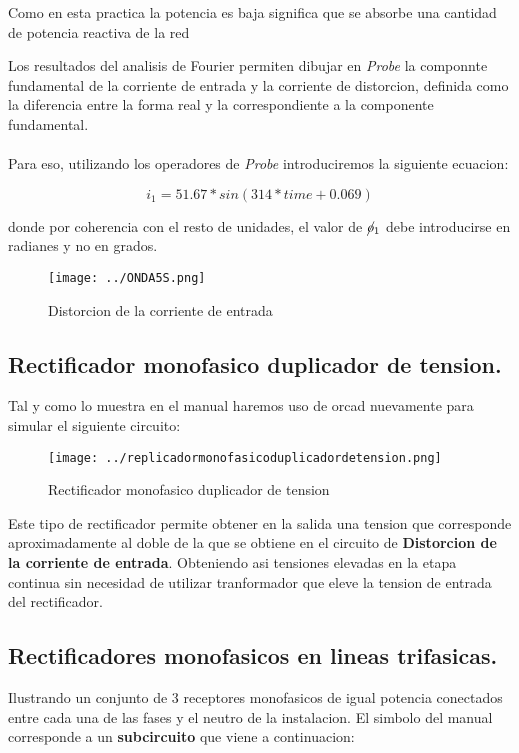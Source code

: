 \documentclass[11pt,a4paper]{article}
\begin{document}
Como en esta practica la potencia es baja significa que se absorbe una cantidad de potencia reactiva de la red 

Los resultados del analisis de Fourier permiten dibujar en \emph{Probe} la componnte fundamental de la corriente de entrada y la corriente de distorcion, definida como la diferencia entre la forma real y la correspondiente a la componente fundamental.\\
\\
Para eso, utilizando los operadores de \emph{Probe} introduciremos la siguiente ecuacion:

$$ i_{1} = 51.67 * sin(314*time + 0.069) $$

donde por coherencia con el resto de unidades, el valor de $ \cancel{o}_{1} $ debe introducirse en radianes y no en grados.

\begin{figure}[h]
\centering
\texttt{[image: ../ONDA5S.png]} 
\caption{Distorcion de la corriente de entrada}
\end{figure}

\subsection{Rectificador monofasico duplicador de tension.}
Tal y como lo muestra en el manual haremos uso de orcad nuevamente para simular el siguiente circuito:

\begin{figure}[h]
\centering
\texttt{[image: ../replicadormonofasicoduplicadordetension.png]} 
\caption{Rectificador monofasico duplicador de tension}
\end{figure}

Este tipo de rectificador permite obtener en la salida una tension que corresponde aproximadamente al doble de la que se obtiene en el circuito de \textbf{Distorcion de la corriente de entrada}. Obteniendo asi tensiones elevadas en la etapa continua sin necesidad de utilizar tranformador que eleve la tension de entrada del rectificador.

\subsection{Rectificadores monofasicos en lineas trifasicas.}
Ilustrando un conjunto de 3 receptores monofasicos de igual potencia conectados entre cada una de las fases y el neutro de la instalacion. El simbolo del manual corresponde a un \textbf{subcircuito} que viene a continuacion:
\end{document}
